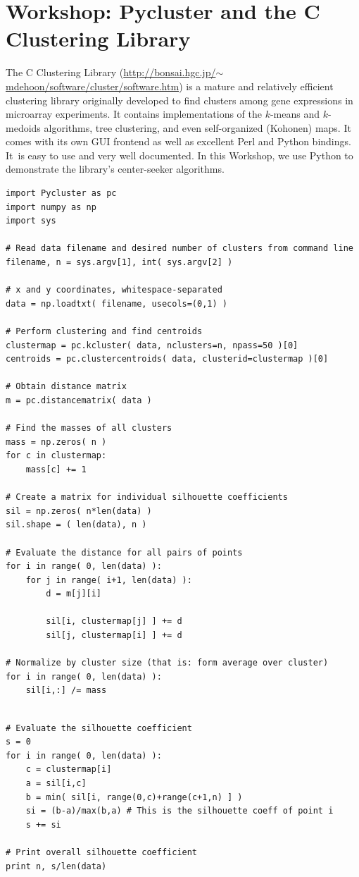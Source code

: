 \section{Workshop: Pycluster and the C Clustering Library}


The C Clustering Library (\url{http://bonsai.hgc.jp/}$\sim$\url{mdehoon/software/cluster/software.htm}) is a mature and relatively efficient
clustering library originally developed to find clusters among gene
expressions in microarray experiments. It contains implementations of
the $k$-means and $k$-medoids algorithms, tree clustering, and even
self-organized (Kohonen) maps.  It comes with its own GUI frontend as
well as excellent Perl and Python bindings. It~is easy to use and very
well documented. In this Workshop, we use Python to demonstrate the
library's center-seeker algorithms.

\begin{verbatim}
import Pycluster as pc
import numpy as np
import sys

# Read data filename and desired number of clusters from command line
filename, n = sys.argv[1], int( sys.argv[2] )

# x and y coordinates, whitespace-separated
data = np.loadtxt( filename, usecols=(0,1) )

# Perform clustering and find centroids
clustermap = pc.kcluster( data, nclusters=n, npass=50 )[0]
centroids = pc.clustercentroids( data, clusterid=clustermap )[0]

# Obtain distance matrix
m = pc.distancematrix( data )

# Find the masses of all clusters
mass = np.zeros( n )
for c in clustermap:
    mass[c] += 1

# Create a matrix for individual silhouette coefficients
sil = np.zeros( n*len(data) )
sil.shape = ( len(data), n )

# Evaluate the distance for all pairs of points
for i in range( 0, len(data) ):
    for j in range( i+1, len(data) ):
        d = m[j][i]

        sil[i, clustermap[j] ] += d
        sil[j, clustermap[i] ] += d

# Normalize by cluster size (that is: form average over cluster)
for i in range( 0, len(data) ):
    sil[i,:] /= mass
\end{verbatim}
\begin{verbatim}

# Evaluate the silhouette coefficient
s = 0
for i in range( 0, len(data) ):
    c = clustermap[i]
    a = sil[i,c]
    b = min( sil[i, range(0,c)+range(c+1,n) ] )
    si = (b-a)/max(b,a) # This is the silhouette coeff of point i
    s += si

# Print overall silhouette coefficient
print n, s/len(data)
\end{verbatim}

